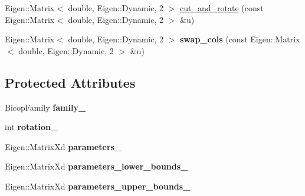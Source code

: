 {\bf }\par
\begin{DoxyCompactItemize}
\item 
Eigen\+::\+Matrix$<$ double, Eigen\+::\+Dynamic, 2 $>$ \hyperlink{classvinecopulib_1_1_bicop_a72bef78e15ecce5a195c71ab7abf030c}{cut\+\_\+and\+\_\+rotate} (const Eigen\+::\+Matrix$<$ double, Eigen\+::\+Dynamic, 2 $>$ \&u)
\item 
Eigen\+::\+Matrix$<$ double, Eigen\+::\+Dynamic, 2 $>$ {\bfseries swap\+\_\+cols} (const Eigen\+::\+Matrix$<$ double, Eigen\+::\+Dynamic, 2 $>$ \&u)\hypertarget{classvinecopulib_1_1_bicop_aaa768f5957af2b4d043e6a29b0500573}{}\label{classvinecopulib_1_1_bicop_aaa768f5957af2b4d043e6a29b0500573}

\end{DoxyCompactItemize}

\subsection*{Protected Attributes}
\begin{DoxyCompactItemize}
\item 
Bicop\+Family {\bfseries family\+\_\+}\hypertarget{classvinecopulib_1_1_bicop_aba9d36d57f3c7aaa8e119f52e0d732ea}{}\label{classvinecopulib_1_1_bicop_aba9d36d57f3c7aaa8e119f52e0d732ea}

\item 
int {\bfseries rotation\+\_\+}\hypertarget{classvinecopulib_1_1_bicop_a8730514d4d92ef8ec400a3336d5f1f4d}{}\label{classvinecopulib_1_1_bicop_a8730514d4d92ef8ec400a3336d5f1f4d}

\item 
Eigen\+::\+Matrix\+Xd {\bfseries parameters\+\_\+}\hypertarget{classvinecopulib_1_1_bicop_a0cf5f9ed3e49f48d561cedc81d08cf07}{}\label{classvinecopulib_1_1_bicop_a0cf5f9ed3e49f48d561cedc81d08cf07}

\item 
Eigen\+::\+Matrix\+Xd {\bfseries parameters\+\_\+lower\+\_\+bounds\+\_\+}\hypertarget{classvinecopulib_1_1_bicop_a3cefe4b2d05df4e92682660702609983}{}\label{classvinecopulib_1_1_bicop_a3cefe4b2d05df4e92682660702609983}

\item 
Eigen\+::\+Matrix\+Xd {\bfseries parameters\+\_\+upper\+\_\+bounds\+\_\+}\hypertarget{classvinecopulib_1_1_bicop_aac56fc06af8639918bf07d3f558b5435}{}\label{classvinecopulib_1_1_bicop_aac56fc06af8639918bf07d3f558b5435}

\end{DoxyCompactItemize}


